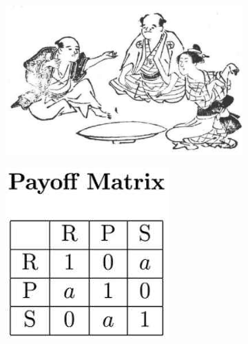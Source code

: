 \documentclass[]{article}
\begin{document}
\begin{figure}[H]
	\caption{Rock, paper, scissors}\label{fig:rockpaperscissors}
	\begin{subfigure}[t]{0.3\textwidth}
		\includegraphics[width=\textwidth]{rockpaperscissors}
	\end{subfigure}
	\begin{subfigure}[t]{0.3\textwidth}
		\includegraphics[width=\textwidth]{rockpaperscissors-payoff}
	\end{subfigure}
	\begin{subfigure}[t]{0.3\textwidth}

\end{subfigure}
\end{figure}
\end{document}
